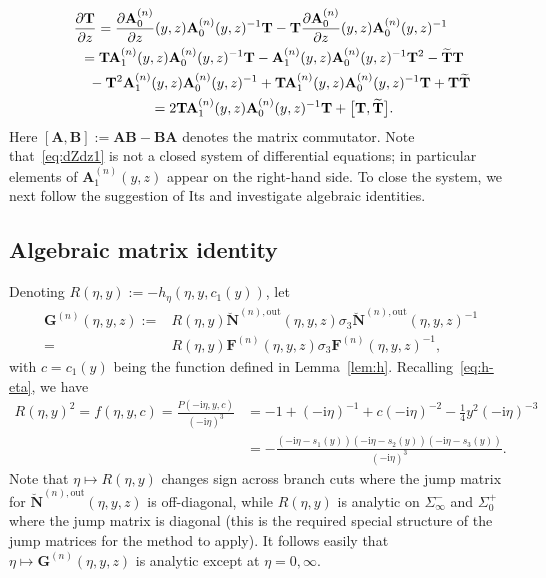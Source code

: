 \begin{gather}
\frac{\partial\mathbf{T}}{\partial z} = \frac{\partial\mathbf{A}_0^{(n)}}{\partial z}(y,z)\mathbf{A}_0^{(n)}(y,z)^{-1}\mathbf{T}-\mathbf{T}\frac{\partial\mathbf{A}_0^{(n)}}{\partial z}(y,z)\mathbf{A}_0^{(n)}(y,z)^{-1}\nonumber\\
\hphantom{\frac{\partial\mathbf{T}}{\partial z}}{} =\mathbf{T}\mathbf{A}_1^{(n)}(y,z)\mathbf{A}_0^{(n)}(y,z)^{-1}\mathbf{T}-\mathbf{A}_1^{(n)}(y,z)\mathbf{A}_0^{(n)}(y,z)^{-1}\mathbf{T}^2-\widetilde{\mathbf{T}}\mathbf{T} \nonumber\\
\hphantom{\frac{\partial\mathbf{T}}{\partial z}=}{} -\mathbf{T}^2\mathbf{A}_1^{(n)}(y,z)\mathbf{A}_0^{(n)}(y,z)^{-1}+\mathbf{T}\mathbf{A}_1^{(n)}(y,z)\mathbf{A}_0^{(n)}(y,z)^{-1}\mathbf{T}+\mathbf{T}\widetilde{\mathbf{T}}\nonumber\\
\hphantom{\frac{\partial\mathbf{T}}{\partial z}}{} =2\mathbf{T}\mathbf{A}_1^{(n)}(y,z)\mathbf{A}_0^{(n)}(y,z)^{-1}\mathbf{T}+\big[\mathbf{T},\widetilde{\mathbf{T}}\big].\label{eq:dZdz1}
\end{gather}
Here $[\mathbf{A},\mathbf{B}]:=\mathbf{AB}-\mathbf{BA}$ denotes the matrix commutator. Note that~\eqref{eq:dZdz1} is not a closed system of differential equations; in particular elements of $\mathbf{A}_1^{(n)}(y,z)$ appear on the right-hand side. To close the system, we next follow the suggestion of Its and investigate algebraic identities.

\subsection{Algebraic matrix identity}
Denoting $R(\eta,y):=-h_\eta(\eta,y,c_1(y))$, let
\begin{align}
\mathbf{G}^{(n)}(\eta,y,z):={} & R(\eta,y)\breve{\mathbf{N}}^{(n),\mathrm{out}}(\eta,y,z)\sigma_3\breve{\mathbf{N}}^{(n),\mathrm{out}}(\eta,y,z)^{-1} \nonumber\\
 = {} & R(\eta,y)\mathbf{F}^{(n)}(\eta,y,z)\sigma_3\mathbf{F}^{(n)}(\eta,y,z)^{-1},
\label{eq:G-def}
\end{align}
with $c=c_1(y)$ being the function defined in Lemma~\ref{lem:h}. Recalling~\eqref{eq:h-eta}, we have
\begin{align*}
R(\eta,y)^2 = f(\eta,y,c)=\frac{P(-\mathrm{i}\eta,y,c)}{(-\mathrm{i}\eta)^3} &= -1+(-\mathrm{i}\eta)^{-1}+c(-\mathrm{i}\eta)^{-2}-\tfrac{1}{4}y^2(-\mathrm{i}\eta)^{-3} \\ &= -\frac{(-\mathrm{i}\eta-s_1(y))(-\mathrm{i}\eta-s_2(y))(-\mathrm{i}\eta-s_3(y))}{(-\mathrm{i}\eta)^3}.
\end{align*}
Note that $\eta\mapsto R(\eta,y)$ changes sign across branch cuts where the jump matrix for $\breve{\mathbf{N}}^{(n),\mathrm{out}}(\eta,y,z)$ is off-diagonal, while $R(\eta,y)$ is analytic on $\Sigma_\infty^-$ and $\Sigma_0^+$ where the jump matrix is diagonal (this is the required special structure of the jump matrices for the method to apply). It follows easily that $\eta\mapsto\mathbf{G}^{(n)}(\eta,y,z)$ is analytic except at $\eta=0,\infty$.

